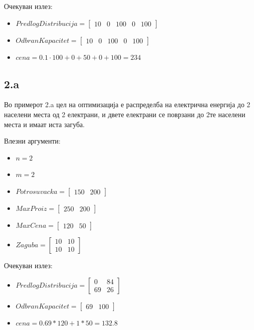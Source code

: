 \documentclass{article}
\begin{document}
Очекуван излез:
\begin{itemize}
\item $PredlogDistribucija = \begin{bmatrix}  10 & 0 & 100 & 0 & 100 \end{bmatrix}$
\item $OdbranKapacitet = \begin{bmatrix} 10 & 0 & 100 & 0 & 100\end{bmatrix}$
\item $cena = 0.1 \cdot 100 + 0 + 50 + 0 + 100 = 234 $
\end{itemize}

\subsection{2.a}
Во примерот 2.a цел на оптимизација е распределба на електрична енергија до 2 населени места од 2 електрани, и двете електрани се поврзани до 2те населени места и имаат иста загуба. 

Влезни аргументи:
\begin{itemize}
\item $n = 2$
\item $m = 2$
\item $Potrosuvacka = \begin{bmatrix} 150 & 200\end{bmatrix}$
\item $MaxProiz = \begin{bmatrix} 250 & 200 \end{bmatrix}$
\item $MaxCena = \begin{bmatrix} 120 & 50 \end{bmatrix}$
\item $Zaguba = \begin{bmatrix} 10 & 10\\ 10 & 10 \end{bmatrix}$
\end{itemize}

Очекуван излез:
\begin{itemize}
\item $PredlogDistribucija = \begin{bmatrix} 0 & 84 \\ 69 & 26 \end{bmatrix}$
\item $OdbranKapacitet = \begin{bmatrix} 69 & 100 \end{bmatrix}$
\item $cena = 0.69 * 120 + 1 * 50 = 132.8$
\end{itemize}
\end{document}
